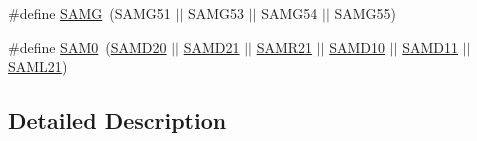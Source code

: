 \begin{DoxyCompactItemize}
\item 
\#define \hyperlink{group__sam__part__macros__group_gad4ae7782abc1e1087067d9958af3381c}{S\-A\-M\-G}~(S\-A\-M\-G51 $|$$|$ S\-A\-M\-G53 $|$$|$ S\-A\-M\-G54 $|$$|$ S\-A\-M\-G55)
\item 
\#define \hyperlink{group__sam__part__macros__group_ga5f347b54588ccfc00042a0272f1c0306}{S\-A\-M0}~(\hyperlink{group__sam__part__macros__group_gad9193543e761f5967353a0464dde1e61}{S\-A\-M\-D20} $|$$|$ \hyperlink{group__sam__part__macros__group_gab9217b15071242235d3014381d61dbf7}{S\-A\-M\-D21} $|$$|$ \hyperlink{group__sam__part__macros__group_ga63b66a40b044f5f10d6dfa3ff51a0acb}{S\-A\-M\-R21} $|$$|$ \hyperlink{group__sam__part__macros__group_gac83f6794433f2c57bfc5c520fe3d67ce}{S\-A\-M\-D10} $|$$|$ \hyperlink{group__sam__part__macros__group_ga9e5edb5637174377186d92141e7f60d9}{S\-A\-M\-D11} $|$$|$ \hyperlink{group__sam__part__macros__group_ga38e970d13ac9ee9d74c527ab43bc5c36}{S\-A\-M\-L21})
\end{DoxyCompactItemize}


\subsection{Detailed Description}


